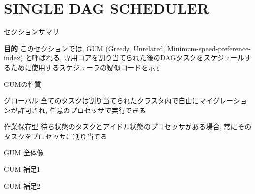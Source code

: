 
\section{SINGLE DAG SCHEDULER}
\label{sec: SINGLE DAG SCHEDULER}

\begin{frame}{セクションサマリ}
    \begin{itembox}[l]{\textbf{目的}}
        このセクションでは, GUM (Greedy, Unrelated, Minimum-speed-preference-index) と呼ばれる, 専用コアを割り当てられた後のDAGタスクをスケジュールするために使用するスケジューラの疑似コードを示す
    \end{itembox}
\end{frame}

\begin{frame}{GUMの性質}
    \begin{block}{グローバル}
        全てのタスクは割り当てられたクラスタ内で自由にマイグレーションが許可され, 任意のプロセッサで実行できる
    \end{block}
    \begin{block}{作業保存型}
        待ち状態のタスクとアイドル状態のプロセッサがある場合, 常にそのタスクをプロセッサに割り当てる
    \end{block}
\end{frame}

\begin{frame}{GUM 全体像}
\end{frame}

\begin{frame}{GUM 補足1}
\end{frame}

\begin{frame}{GUM 補足2}
\end{frame}
